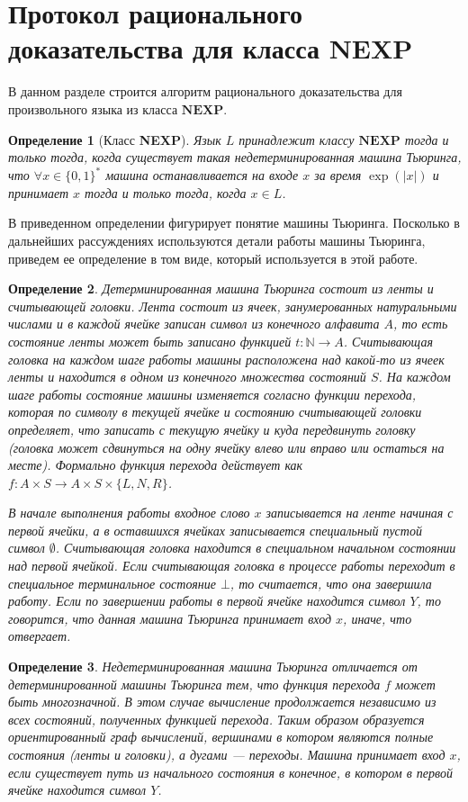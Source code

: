 \documentclass[14pt, a4paper, russian]{report}
\newtheorem{definition}{\indent Определение}
\newcommand{\word}{\{0, 1\}^*}
\begin{document}
        \section{Протокол рационального доказательства для класса $\textbf{NEXP}$}
        В данном разделе строится алгоритм рационального доказательства для произвольного языка из класса $\textbf{NEXP}$.
        \begin{definition}[Класс \textbf{NEXP}]Язык $L$ принадлежит классу $\textbf{NEXP}$ тогда и только тогда, когда существует такая недетерминированная машина Тьюринга, что $\forall x \in \word$ машина останавливается на входе $x$ за время $\exp(|x|)$ и принимает $x$ тогда и только тогда, когда $x \in L$.
        \end{definition}
        В приведенном определении фигурирует понятие машины Тьюринга. Посколько в дальнейших рассуждениях используются детали работы машины Тьюринга, приведем ее определение в том виде, который используется в этой работе.
        \begin{definition}Детерминированная машина Тьюринга состоит из ленты и считывающей головки. Лента состоит из ячеек, занумерованных натуральными числами и в каждой ячейке записан символ из конечного алфавита $A$, то есть состояние ленты может быть записано функцией $t: \mathbb{N} \longrightarrow A$. Считывающая головка на каждом шаге работы машины расположена над какой-то из ячеек ленты и находится в одном из конечного множества состояний $S$. На каждом шаге работы состояние машины изменяется согласно функции перехода, которая по символу в текущей ячейке и состоянию считывающей головки определяет, что записать с текущую ячейку и куда передвинуть головку (головка может сдвинуться на одну ячейку влево или вправо или остаться на месте). Формально функция перехода действует как $f: A \times S \longrightarrow A \times S \times \{L, N, R\}$.

            В начале выполнения работы входное слово $x$ записывается на ленте начиная с первой ячейки, а в оставшихся ячейках записывается специальный пустой символ $\emptyset$. Считывающая головка находится в специальном начальном состоянии над первой ячейкой. Если считывающая головка в процессе работы переходит в специальное терминальное состояние $\bot$, то считается, что она завершила работу. Если по завершении работы в первой ячейке находится символ $Y$, то говорится, что данная машина Тьюринга принимает вход $x$, иначе, что отвергает.
        \end{definition}
        \begin{definition}
            Недетерминированная машина Тьюринга отличается от детерминированной машины Тьюринга тем, что функция перехода $f$ может быть многозначной. В этом случае вычисление продолжается независимо из всех состояний, полученных функцией перехода. Таким образом образуется ориентированный граф вычислений, вершинами в котором являются полные состояния (ленты и головки), а дугами --- переходы. Машина принимает вход $x$, если существует путь из начального состояния в конечное, в котором в первой ячейке находится символ $Y$.
        \end{definition}
\end{document}
